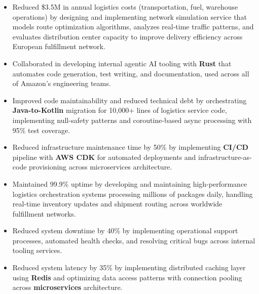 
\begin{itemize}[topsep=0pt]
  \item Reduced \$3.5M in annual logistics costs (transportation, fuel, warehouse operations) by designing and implementing network simulation service that models route optimization algorithms, analyzes real-time traffic patterns, and evaluates distribution center capacity to improve delivery efficiency across European fulfillment network.
  \item Collaborated in developing internal agentic AI tooling with \textbf{Rust} that automates code generation, test writing, and documentation, used across all of Amazon's engineering teams.
  \item Improved code maintainability and reduced technical debt by orchestrating \textbf{Java-to-Kotlin} migration for 10,000+ lines of logistics service code, implementing null-safety patterns and coroutine-based async processing with 95\% test coverage.
  \item Reduced infrastructure maintenance time by 50\% by implementing \textbf{CI/CD} pipeline with \textbf{AWS CDK} for automated deployments and infrastructure-as-code provisioning across microservices architecture.
  \item Maintained 99.9\% uptime by developing and maintaining high-performance logistics orchestration systems processing millions of packages daily, handling real-time inventory updates and shipment routing across worldwide fulfillment networks.
  \item Reduced system downtime by 40\% by implementing operational support processes, automated health checks, and resolving critical bugs across internal tooling services.
  \item Reduced system latency by 35\% by implementing distributed caching layer using \textbf{Redis} and optimizing data access patterns with connection pooling across \textbf{microservices} architecture.
\end{itemize}

